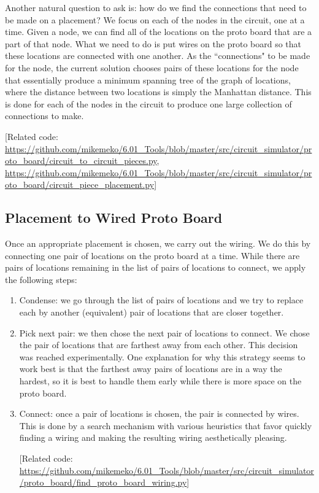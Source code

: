 \documentclass[12pt]{amsart}
\begin{document}
Another natural question to ask is: how do we find the connections that need to be made on a placement? We focus on each of the nodes in the circuit, one at a time. Given a node, we can find all of the locations on the proto board that are a part of that node. What we need to do is put wires on the proto board so that these locations are connected with one another. As the ``connections" to be made for the node, the current solution chooses pairs of these locations for the node that essentially produce a minimum spanning tree of the graph of locations, where the distance between two locations is simply the Manhattan distance. This is done for each of the nodes in the circuit to produce one large collection of connections to make.

[Related code: \url{https://github.com/mikemeko/6.01_Tools/blob/master/src/circuit_simulator/proto_board/circuit_to_circuit_pieces.py}, \url{https://github.com/mikemeko/6.01_Tools/blob/master/src/circuit_simulator/proto_board/circuit_piece_placement.py}]

\subsection{Placement to Wired Proto Board}

Once an appropriate placement is chosen, we carry out the wiring. We do this by connecting one pair of locations on the proto board at a time. While there are pairs of locations remaining in the list of pairs of locations to connect, we apply the following steps:

\begin{enumerate}
\item Condense: we go through the list of pairs of locations and we try to replace each by another (equivalent) pair of locations that are closer together.
\item Pick next pair: we then chose the next pair of locations to connect. We chose the pair of locations that are farthest away from each other. This decision was reached experimentally. One explanation for why this strategy seems to work best is that the farthest away pairs of locations are in a way the hardest, so it is best to handle them early while there is more space on the proto board.
\item Connect: once a pair of locations is chosen, the pair is connected by wires. This is done by a search mechanism with various heuristics that favor quickly finding a wiring and making the resulting wiring aesthetically pleasing.

[Related code: \url{https://github.com/mikemeko/6.01_Tools/blob/master/src/circuit_simulator/proto_board/find_proto_board_wiring.py}]
\end{enumerate}
\end{document}
